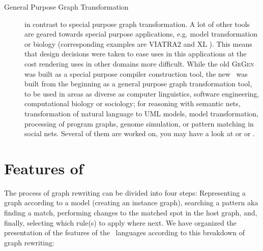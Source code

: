 \begin{description}
\item[General Purpose Graph Transformation]
in contrast to special purpose graph transformation.
A lot of other tools are geared towards special purpose applications, e.g. model transformation or biology (corresponding examples are VIATRA2\cite{viatra2} and XL \cite{xl}).
This means that design decisions were taken to ease uses in this applications at the cost rendering uses in other domains more difficult.
While the old \textsc{GrGen} was built as a special purpose compiler construction tool, the new \GrG\ was built from the beginning as a general purpose graph transformation tool,
to be used in areas as diverse as computer linguistics, software engineering, computational biology or sociology;
for reasoning with semantic nets, transformation of natural language to UML models,
model transformation, processing of program graphs, genome simulation, or pattern matching in social nets. 
Several of them are worked on, you may have a look at \cite{usecomputerlinguistics} or \cite{usemodeltransformation} or \cite{usegeneexpression}.

\end{description}


\section{Features of \GrG}

The process of graph rewriting can be divided into four steps:
Representing a graph according to a model (creating an instance graph), 
searching a pattern aka finding a match, 
performing changes to the matched spot in the host graph, 
and, finally, selecting which rule(s) to apply where next.
We have organized the presentation of the features of the \GrG\ languages according to this breakdown of graph rewriting:

